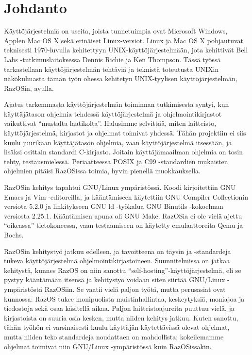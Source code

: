 \chapter{Johdanto}
\label{Johdanto}

Käyttöjärjestelmiä on useita, joista tunnetuimpia ovat Microsoft Windows, Applen Mac OS X sekä erinäiset Linux-versiot. Linux ja Mac OS X pohjautuvat teknisesti 1970-luvulla kehitettyyn UNIX-käyttöjärjestelmään, jota kehittivät Bell Labs -tutkimuslaitoksessa Dennis Richie ja Ken Thompson. Tässä työssä tarkastellaan käyttöjärjestelmän tehtäviä ja teknistä toteutusta UNIXin näkökulmasta tämän työn ohessa kehitetyn UNIX-tyylisen käyttöjärjestelmän, RazOSin, avulla.

\par

Ajatus tarkemmasta käyttöjärjestelmän toiminnan tutkimisesta syntyi, kun käyttäjätason ohjelmia tehdessä käyttöjärjestelmä ja ohjelmointikirjastot vaikuttivat ``mustalta laatikolta''. Halusimme selvittää, miten laitteisto, käyttöjärjestelmä, kirjastot ja ohjelmat toimivat yhdessä. Tähän projektiin ei siis kuulu juurikaan käyttäjätason ohjelmia, vaan käyttöjärjestelmä itsessään, ja lisäksi osittain standardi C-kirjasto. Joitain käyttäjämaailman ohjelmia on tosin tehty, testausmielessä. Periaatteessa POSIX ja C99 -standardien mukaisten ohjelmien pitäisi RazOSissa toimia, hyvin pienellä muokkauksella.

\par

RazOSin kehitys tapahtui GNU/Linux ympäristössä. Koodi kirjoitettiin GNU Emacs ja Vim -editoreilla, ja kääntämiseen käytettiin GNU Compiler Collectionin versiota 5.2.0 ja linkitykseen GNU ld -työkalua GNU Binutils -kokoelman versiosta 2.25.1. Kääntämisen apuna oli GNU Make. RazOSia ei ole vielä ajettu ``oikeassa'' tietokoneessa, vaan testaamiseen on käytetty emulaattoreita Qemu ja Bochs.

\par

RazOSin kehitystyö jatkuu edelleen, ja tavoitteena on täysin \parencite{POSIX} ja \parencite{ISOC99} -standardeja tukeva käyttöjärjestelmä ohjelmointikirjastoineen. Suunnitelmissa on jatkaa kehitystä, kunnes RazOS on niin sanottu ``self-hosting''-käyttöjärjestelmä, eli se pystyy kääntämään itsensä ja kehitystyö voidaan siten siirtää GNU/Linux -ympäristöstä RazOSiin. Se vaatii vielä paljon työtä, mutta perusasiat ovat kunnossa: RazOS tukee monipuolista muistinhallintaa, keskeytyksiä, moniajoa ja tiedostoja sekä osaa käsitellä aikaa. Paljon laitteistoajureita puuttuu vielä, ja kirjastoista on suuria osia kesken, mutta niiden kehitys jatkuu. Kuten sanottu, tähän työhön ei varsinaisesti kuulu käyttäjän käytettävissä olevat ohjelmat, mutta niiden teko standardeja noudattaen on mahdollista; kokeilemamme ohjelmat toimivat niin GNU/Linux -ympäristössä kuin RazOSissakin.


